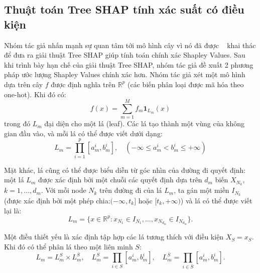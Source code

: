 \documentclass[12pt, a4paper]{article}
\theoremstyle{plain}
\theoremstyle{proposition}
\theoremstyle{lemma}
\begin{document}
\subsection{Thuật toán Tree SHAP tính xác suất có điều kiện}
Nhóm tác giả nhấn mạnh sự quan tâm tới mô hình cây vì nó đã được ~\citep{lundberg2020local2global} khai thác để đưa ra giải thuật Tree SHAP giúp tính toán chính xác Shapley Values. Sau khi trình bày hạn chế của giải thuật Tree SHAP, nhóm tác giả đề xuất 2 phương pháp ước lượng Shapley Values chính xác hơn.
Nhóm tác giả xét một mô hình dựa trên cây $f$ được định nghĩa trên $\mathbb{R}^p$ 
(các biến phân loại được mã hóa theo one-hot). Khi đó có:
\[
f(x) = \sum_{m=1}^{M} f_m \mathbf{1}_{L_m}(x)
\]
trong đó $L_m$ đại diện cho một lá (leaf). Các lá tạo thành một vùng của không gian đầu vào, 
và mỗi lá có thể được viết dưới dạng:
\[
L_m = \prod_{i=1}^{p} [a_m^i, b_m^i], \quad (-\infty \le a_m^i < b_m^i \le +\infty)
\]

Mặt khác, lá cũng có thể được biểu diễn từ góc nhìn của đường đi quyết định: 
một lá $L_m$ được xác định bởi một chuỗi các quyết định dựa trên $d_m$ biến $X_{N_k}$, $k = 1, \dots, d_m$. 
Với mỗi node $N_k$ trên đường đi của lá $L_m$, ta gán một miền $I_{N_k}$ 
(được xác định bởi một phép chia:$(-\infty, t_k]$ hoặc $[t_k, +\infty)$) và lá có thể được viết lại là:
\[
L_m = \{ x \in \mathbb{R}^p : x_{N_1} \in I_{N_1}, \dots, x_{N_{d_m}} \in I_{N_{d_m}} \}.
\]

Một điều thiết yếu là xác định tập hợp các lá tương thích với điều kiện $X_S = x_S$. 
Khi đó có thể phân lá theo một liên minh $S$:
\[
L_m = L_m^S \times L_m^{\bar{S}}, \quad 
L_m^S = \prod_{i \in S} [a_m^i, b_m^i], \quad 
L_m^{\bar{S}} = \prod_{i \in \bar{S}} [a_m^i, b_m^i].
\]
\end{document}
